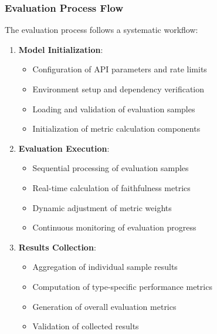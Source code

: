 \subsubsection{Evaluation Process Flow}
The evaluation process follows a systematic workflow:
\begin{enumerate}
    \item \textbf{Model Initialization}:
    \begin{itemize}
        \item Configuration of API parameters and rate limits
        \item Environment setup and dependency verification
        \item Loading and validation of evaluation samples
        \item Initialization of metric calculation components
    \end{itemize}

    \item \textbf{Evaluation Execution}:
    \begin{itemize}
        \item Sequential processing of evaluation samples
        \item Real-time calculation of faithfulness metrics
        \item Dynamic adjustment of metric weights
        \item Continuous monitoring of evaluation progress
    \end{itemize}

    \item \textbf{Results Collection}:
    \begin{itemize}
        \item Aggregation of individual sample results
        \item Computation of type-specific performance metrics
        \item Generation of overall evaluation metrics
        \item Validation of collected results
    \end{itemize}
\end{enumerate}

